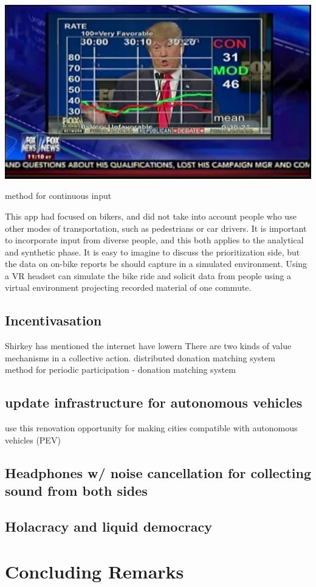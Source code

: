 \begin{marginfigure}[{2cm}]
 \includegraphics[width=\textwidth]{chapters/6/fig/pollester.png}  \caption{method for continuous input}
 \label{fig:poll}
\end{marginfigure}
This app had focused on bikers, and did not take into account people who use other modes of transportation, such as pedestrians or car drivers. It is important to incorporate input from diverse people, and this both applies to the analytical and synthetic phase. It is easy to imagine to discuss the prioritization side, but the data on on-bike reports be should capture in a simulated environment.
Using a VR headset can simulate the bike ride and solicit data from people using a virtual environment projecting recorded material of one commute.

\subsection{Incentivasation}
Shirkey has mentioned the internet have lowern There are two kinds of value mechanisms in a collective action. \cite{shirky2010cognitive}
distributed donation matching system \\
method for periodic participation - donation matching system \\
\subsection {update infrastructure for autonomous vehicles}
use this renovation opportunity for making cities compatible with autonomous vehicles (PEV)
\subsection{Headphones w/ noise cancellation for collecting sound from both
sides}
\subsection{Holacracy and liquid democracy}

\section{Concluding Remarks}
\cite{rudofsky1964architecture}



